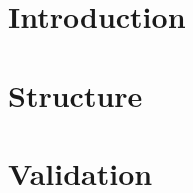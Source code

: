 \documentclass{report}
\begin{document}
\chapter{Introduction}

\chapter{Structure}




\chapter{Validation}





\end{document}
